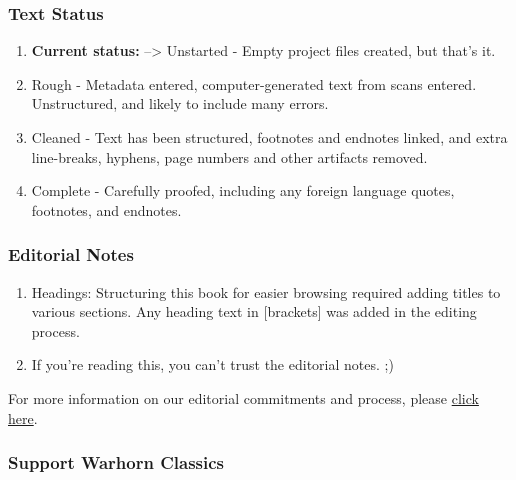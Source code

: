 \documentclass[
]{book}
\providecommand{\tightlist}{%
  \setlength{\itemsep}{0pt}\setlength{\parskip}{0pt}}
\begin{document}
\hypertarget{text-status}{%
\subsubsection*{Text Status}\label{text-status}}

\begin{enumerate}
\def\labelenumi{\arabic{enumi}.}
\setcounter{enumi}{-1}
\tightlist
\item
  \textbf{Current status:} --\textgreater{} Unstarted - Empty project files created, but that's it.
\item
  Rough - Metadata entered, computer-generated text from scans entered. Unstructured, and likely to include many errors.
\item
  Cleaned - Text has been structured, footnotes and endnotes linked, and extra line-breaks, hyphens, page numbers and other artifacts removed.
\item
  Complete - Carefully proofed, including any foreign language quotes, footnotes, and endnotes.
\end{enumerate}

\hypertarget{editorial-notes}{%
\subsubsection*{Editorial Notes}\label{editorial-notes}}

\begin{enumerate}
\def\labelenumi{\arabic{enumi}.}
\tightlist
\item
  Headings: Structuring this book for easier browsing required adding titles to various sections. Any heading text in {[}brackets{]} was added in the editing process.
\item
  If you're reading this, you can't trust the editorial notes. ;)
\end{enumerate}

For more information on our editorial commitments and process, please \href{https://classics.warhornmedia.com/editorial}{click here}.

\hypertarget{support-warhorn-classics}{%
\subsubsection*{Support Warhorn Classics}\label{support-warhorn-classics}}
\end{document}
